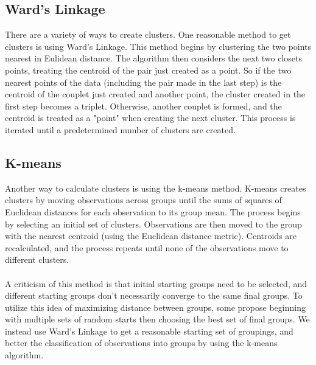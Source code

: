 \documentclass[11pt]{article}
\begin{document}
\subsection*{Ward's Linkage}
There are a variety of ways to create clusters. One reasonable method to get
clusters is using Ward's Linkage. This method begins by clustering the two
points nearest in Eulidean distance. The algorithm then considers the next two
closets points, treating the centroid of the pair just created as a point. So if
the two nearest points of the data (including the pair made in the last step) is
the centroid of the couplet just created and another point, the cluster created
in the first step becomes a triplet. Otherwise, another couplet is formed, and
the centroid is treated as a "point" when creating the next cluster. This
process is iterated until a predetermined number of clusters are created. 

\subsection*{K-means}
Another way to calculate clusters is using the k-means method. K-means creates
clusters by moving observations across groups until the sums of squares of
Euclidean distances for each observation to its group mean. The process begins by
selecting an initial set of clusters. Observations are then moved to the group
with the nearest centroid (using the Euclidean distance metric). Centroids
are recalculated, and the process repeats until none of the observations move
to different clusters.
\\
\\
A criticism of this method is that initial starting groups need to be selected,
and different starting groups don't necessarily converge to the same final
groups. To utilize this idea of maximizing distance between groups, some propose
beginning with multiple sets of random starts then choosing the best set of
final groups. We instead use Ward's Linkage to get a reasonable starting set of
groupings, and better the classification of observations into groups by using
the k-means algorithm.
\end{document}
